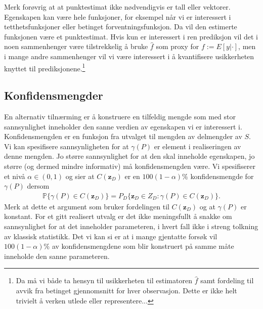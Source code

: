 Merk forøvrig at at punktestimat ikke nødvendigvis er tall eller vektorer. Egenskapen kan være hele funksjoner, for eksempel når vi er interessert i tetthetsfunksjoner eller betinget forventningsfunksjon. Da vil den estimerte funksjonen være et punktestimat. Hvis kun er interessert i ren prediksjon vil det i noen sammenhenger være tilstrekkelig å bruke $\hat{f}$ som proxy for $f:=E[y|\cdot]$, men i mange andre sammenhenger vil vi være interessert i å kvantifisere usikkerheten knyttet til prediksjonene.\footnote{Da må vi både ta hensyn til usikkerheten til estimatoren $\hat{f}$ samt fordeling til avvik fra betinget gjennomsnitt for hver observasjon. Dette er ikke helt trivielt å verken utlede eller representere...}
\subsection{Konfidensmengder}
En alternativ tilnærming er å konstruere en tilfeldig mengde som med stor sannsynlighet inneholder den sanne verdien av egenskapen vi er interessert i. Konfidensmengden er en funksjon fra utvalget til mengden av delmengder av $S$. Vi kan spesifisere sannsynligheten for at $\gamma(P)$ er element i realiseringen av denne mengden. Jo større sannsynlighet for at den skal inneholde egenskapen, jo større (og dermed mindre informativ) må konfidensmengden være. Vi spesifiserer et nivå $\alpha\in(0,1)$ og sier at $C(\mathbf{z}_D)$ er en $100(1-\alpha)\%$ konfidensmengde for $\gamma(P)$ dersom
\begin{align}
\mathbb{P}\{\gamma(P) \in C(\mathbf{z}_D)\} = P_D\{\mathbf{z}_D \in Z_D:\gamma(P) \in C(\mathbf{z}_D)\}.
\end{align}
Merk at dette et argument som bruker fordelingen til $C(\mathbf{z}_D)$ og at $\gamma(P)$ er konstant. For et gitt realisert utvalg er det ikke meningsfullt å snakke om sannsynlighet for at det inneholder parameteren, i hvert fall ikke i streng tolkning av klassisk statistikk. Det vi kan si er at i mange gjentatte forsøk vil $100(1-\alpha)\%$ av konfidensmengdene som blir konstruert på samme måte inneholde den sanne parameteren.
